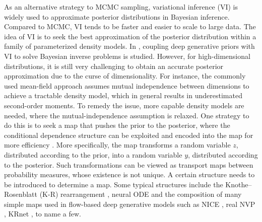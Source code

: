 As an alternative strategy to MCMC sampling, variational inference (VI) is widely used to approximate posterior distributions in Bayesian inference. Compared to MCMC, VI tends to be faster and easier to scale to large data. The idea of VI is to seek the best approximation of the posterior distribution within a family of 
parameterized density models. In \cite{goh2022solving, xia2023vi, tewari-deeppriors-2022}, coupling deep generative priors with VI to solve Bayesian inverse problems is studied.  
However, for high-dimensional distributions, it is still very challenging to
obtain an accurate posterior approximation due to the curse of dimensionality. For instance, the commonly used mean-field approach \cite{blei2017variational} assumes mutual independence between dimensions to achieve a tractable density model, which in general results in underestimated second-order moments.
To remedy the issue, more capable density models are needed, where the mutual-independence assumption is relaxed. One strategy to do this is to seek 
a map that pushes the prior to the posterior, where the conditional dependence structure can be exploited and encoded into the map for more efficiency \cite{spantini2018inference}.  
More specifically, the map transforms a random variable $z$, distributed according to the prior, into a random variable $y$, distributed according to the posterior. Such transformations can be viewed as transport maps between probability measures, %
whose existence is not unique. A certain structure needs to be introduced to determine a map. 
Some typical structures include the Knothe–Rosenblatt (K-R) rearrangement \cite{el2012bayesian}, neural ODE \cite{chen2018neural} and the composition of many simple maps used in flow-based deep generative models such as NICE \cite{Dinh_2014}, real NVP \cite{dinh2016density}, KRnet \cite{tang2020deep,adda_2022,wan2022vae}, to name a few.

